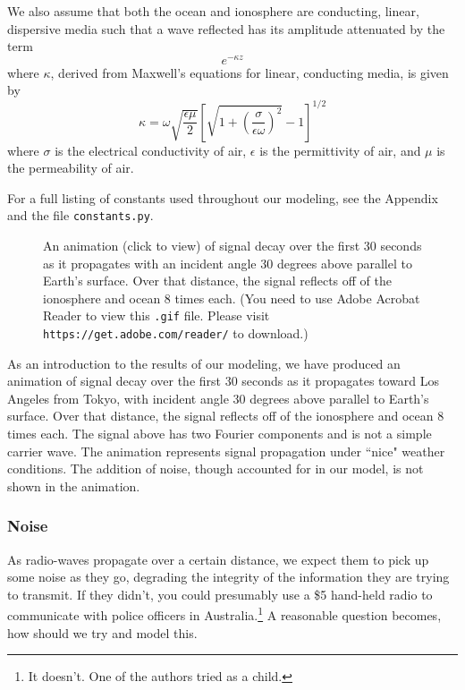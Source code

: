 \documentclass[11pt]{article}
\numberwithin{equation}{section}
\begin{document}
\par We also assume that both the ocean and ionosphere are conducting, linear, dispersive media such that a wave reflected has its amplitude attenuated by the term
\[
e^{-\kappa z}
\]
where $\kappa$, derived from Maxwell's equations for linear, conducting media\cite{griffiths2005introduction}, is given by
\begin{equation}
\kappa = \omega \sqrt{\frac{\epsilon\mu}{2}}\left[ \sqrt{1 + \left( \frac{\sigma}{\epsilon\omega} \right)^2} - 1 \right]^{1/2}
\end{equation}
where $\sigma$ is the electrical conductivity of air, $\epsilon$ is the permittivity of air, and $\mu$ is the permeability of air.
\par For a full listing of constants used throughout our modeling, see the Appendix and the file \verb|constants.py|.

 \begin{figure}[ht]
     \begin{center}
     \end{center}
     \caption{An animation (click to view) of signal decay over the first 30 seconds as it propagates with an incident angle 30 degrees above parallel to Earth’s surface. Over that distance, the signal reflects off of the ionosphere and ocean 8 times each. (You need to use Adobe Acrobat Reader to view this \texttt{.gif} file. Please visit \texttt{https://get.adobe.com/reader/} to download.)}
 \end{figure}
 
As an introduction to the results of our modeling, we have produced an animation of signal decay over the first 30 seconds as it propagates toward Los Angeles from Tokyo, with incident angle 30 degrees above parallel to Earth's surface. Over that distance, the signal reflects off of the ionosphere and ocean 8 times each. The signal above has two Fourier components and is not a simple carrier wave. The animation represents signal propagation under ``nice" weather conditions. The addition of noise, though accounted for in our model, is not shown in the animation. 

\subsubsection{Noise} %
\label{ssub:noise}

As radio-waves propagate over a certain distance, we expect them to pick up some noise as they go, degrading the integrity of the information they are trying to transmit. If they didn't, you could presumably use a \$5 hand-held radio to communicate with police officers in Australia.\footnote{It doesn't. One of the authors tried as a child.} A reasonable question becomes, how should we try and model this.
\end{document}
